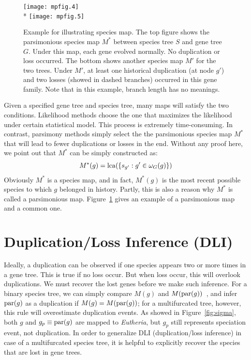 \begin{figure}[!hb]
\begin{center}
\texttt{[image: mpfig.4]}\\*
\texttt{[image: mpfig.5]}
\end{center}
\caption[Example for illustrating species map]{Example for illustrating species map.
The top figure shows the parsimonious species map $M^*$ between species tree $S$ and gene tree $G$. Under
this map, each gene evolved normally. No duplication or loss occurred.
The bottom shows another species map $M'$ for the two trees. Under $M'$, at
least one historical duplication (at node $g'$) and two losses (showed in dashed branches)
occurred in this gene family. Note that in this example, branch length has no meanings.}\label{fig:specmap-exa}
\end{figure}

Given a specified gene tree and species tree, many maps will satisfy the two conditions.
Likelihood methods choose the one that maximizes the likelihood under certain statistical
model. This process is extremely time-consuming. In contrast, parsimony methods simply select the
the parsimonious species map $M^*$ that will lead to fewer duplications or losses in the end.
Without any proof here, we point out that $M^*$ can be simply constructed as:
\begin{equation}\label{equ:par-M}
M^*(g)=\mathrm{lca}(\{s_{g'}:g'\in\omega_G(g)\})
\end{equation}
Obviously $M^*$ is a species map, and in fact, $M^*(g)$ is the most recent
possible species to which $g$ belonged in history. Partly, this is also a reason why
$M^*$ is called a parsimonious map. Figure~\ref{fig:specmap-exa} gives an example of a parsimonious map and a common one.

\section{Duplication/Loss Inference (DLI)}

Ideally, a duplication can be observed if one species appears two or more times in
a gene tree. This is true if no loss occur. But when loss occur, this will overlook duplications.
We must recover the lost genes before we make such inference. For a binary species tree,
we can simply compare $M(g)$ and $M(\mathrm{par}(g))$~\cite{zmasek01}, and infer $\mathrm{par}(g)$ as a duplication
if $M(g)=M(\mathrm{par}(g))$; for a multifurcated tree, however, this rule will
overestimate duplication events. As showed in Figure~\ref{fig:sigma}, both $g$ and
$g_p\equiv\mathrm{par}(g)$ are mapped to {\it Eutheria}, but $g_p$ still represents speciation event, not
duplication. In order to generalize DLI (duplication/loss inference)
in case of a multifurcated species tree, it is helpful
to explicitly recover the species that are lost in gene trees.

